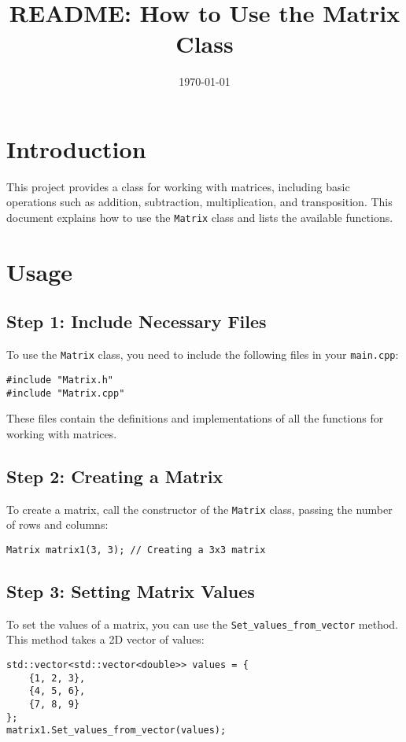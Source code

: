 \documentclass{article}
\title{README: How to Use the Matrix Class}
\author{}
\date{\today}
\begin{document}
\maketitle

\section{Introduction}
This project provides a class for working with matrices, including basic operations such as addition, subtraction, multiplication, and transposition. This document explains how to use the \texttt{Matrix} class and lists the available functions.

\section{Usage}
\subsection{Step 1: Include Necessary Files}
To use the \texttt{Matrix} class, you need to include the following files in your \texttt{main.cpp}:

\begin{verbatim}
#include "Matrix.h"
#include "Matrix.cpp"
\end{verbatim}

These files contain the definitions and implementations of all the functions for working with matrices.

\subsection{Step 2: Creating a Matrix}
To create a matrix, call the constructor of the \texttt{Matrix} class, passing the number of rows and columns:

\begin{verbatim}
Matrix matrix1(3, 3); // Creating a 3x3 matrix
\end{verbatim}

\subsection{Step 3: Setting Matrix Values}
To set the values of a matrix, you can use the \texttt{Set\_values\_from\_vector} method. This method takes a 2D vector of values:

\begin{verbatim}
std::vector<std::vector<double>> values = {
    {1, 2, 3},
    {4, 5, 6},
    {7, 8, 9}
};
matrix1.Set_values_from_vector(values);
\end{verbatim}
\end{document}
